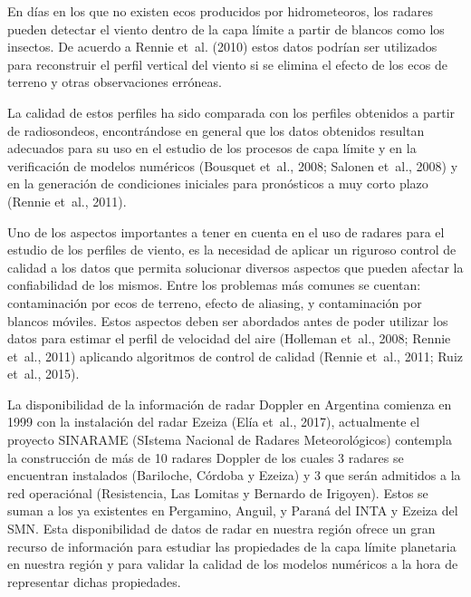 \documentclass[12pt,spanish,oneside, a4paper]{book}
\begin{document}
En días en los que no existen ecos producidos por hidrometeoros, los
radares pueden detectar el viento dentro de la capa límite a partir de
blancos como los insectos. De acuerdo a Rennie et~al. (2010) estos datos
podrían ser utilizados para reconstruir el perfil vertical del viento si
se elimina el efecto de los ecos de terreno y otras observaciones
erróneas.

La calidad de estos perfiles ha sido comparada con los perfiles
obtenidos a partir de radiosondeos, encontrándose en general que los
datos obtenidos resultan adecuados para su uso en el estudio de los
procesos de capa límite y en la verificación de modelos numéricos
(Bousquet et~al., 2008; Salonen et~al., 2008) y en la generación de
condiciones iniciales para pronósticos a muy corto plazo (Rennie et~al.,
2011).

Uno de los aspectos importantes a tener en cuenta en el uso de radares
para el estudio de los perfiles de viento, es la necesidad de aplicar un
riguroso control de calidad a los datos que permita solucionar diversos
aspectos que pueden afectar la confiabilidad de los mismos. Entre los
problemas más comunes se cuentan: contaminación por ecos de terreno,
efecto de aliasing, y contaminación por blancos móviles. Estos aspectos
deben ser abordados antes de poder utilizar los datos para estimar el
perfil de velocidad del aire (Holleman et~al., 2008; Rennie et~al.,
2011) aplicando algoritmos de control de calidad (Rennie et~al., 2011;
Ruiz et~al., 2015).

La disponibilidad de la información de radar Doppler en Argentina
comienza en 1999 con la instalación del radar Ezeiza (Elía et~al.,
2017), actualmente el proyecto SINARAME (SIstema Nacional de Radares
Meteorológicos) contempla la construcción de más de 10 radares Doppler
de los cuales 3 radares se encuentran instalados (Bariloche, Córdoba y
Ezeiza) y 3 que serán admitidos a la red operaciónal (Resistencia, Las
Lomitas y Bernardo de Irigoyen). Estos se suman a los ya existentes en
Pergamino, Anguil, y Paraná del INTA y Ezeiza del SMN. Esta
disponibilidad de datos de radar en nuestra región ofrece un gran
recurso de información para estudiar las propiedades de la capa límite
planetaria en nuestra región y para validar la calidad de los modelos
numéricos a la hora de representar dichas propiedades.
\end{document}
